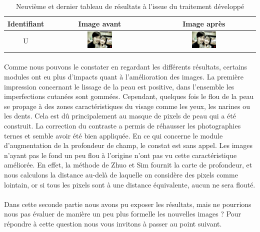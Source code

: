 \documentclass[11pt, french]{report-rd-info}
\begin{document}
\begin{table}
\centering
\begin{tabular}{|c|c|c|}	
   \hline \textbf{Identifiant}  &  \textbf{Image avant}  &  \textbf{Image après}  \\ \hline 
   U & \includegraphics[width=0.25\textwidth]{Resultats/pu_avant} & \includegraphics[width=0.25\textwidth]{Resultats/pu_apres}\\ \hline
\end{tabular}
\caption{Neuvième et dernier tableau de résultats à l'issue du traitement développé}
\label{tab:Resultats9}
\end{table}



\paragraph*{}
Comme nous pouvons le constater en regardant les différents résultats, certains modules ont eu plus d'impacts quant à l'amélioration des images. La première impression concernant le lissage de la peau est positive, dans l'ensemble les imperfections cutanées sont gommées. Cependant, quelques fois le flou de la peau se propage à des zones caractéristiques du visage comme les yeux, les narines ou les dents. Cela est dû principalement au masque de pixels de peau qui a été construit. 
La correction du contraste a permis de réhausser les photographies ternes et semble avoir été bien appliquée.
En ce qui concerne le module d'augmentation de la profondeur de champ, le constat est sans appel. Les images n'ayant pas le fond un peu flou à l'origine n'ont pas vu cette caractéristique améliorée. En effet, la méthode de Zhuo et Sim \cite{Zhuo2011} fournit la carte de profondeur, et nous calculons la distance au-delà de laquelle on considère des pixels comme lointain, or si tous les pixels sont à une distance équivalente, aucun ne sera flouté.

\paragraph*{}
Dans cette seconde partie nous avons pu exposer les résultats, mais ne pourrions nous pas évaluer de manière un peu plus formelle les nouvelles images ? Pour répondre à cette question nous vous invitons à passer au point suivant.
\end{document}
